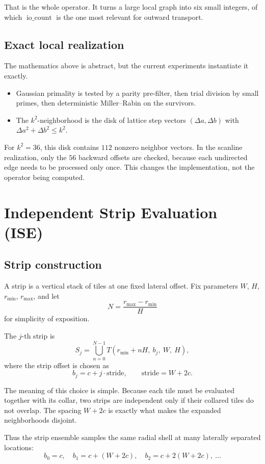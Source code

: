 \documentclass[12pt,letterpaper]{article}
\theoremstyle{definition}
\theoremstyle{remark}
\newcommand{\iocount}{\operatorname{io\_count}}
\begin{document}
That is the whole operator. It turns a large local graph into six small integers, of which $\iocount$ is the one most relevant for outward transport.

\subsection{Exact local realization}

The mathematics above is abstract, but the current experiments instantiate it exactly.

\begin{itemize}
\item Gaussian primality is tested by a parity pre-filter, then trial division by small primes, then deterministic Miller--Rabin on the survivors.
\item The $k^2$-neighborhood is the disk of lattice step vectors $(\Delta a,\Delta b)$ with $\Delta a^2+\Delta b^2\le k^2$.
\end{itemize}

For $k^2=36$, this disk contains $112$ nonzero neighbor vectors. In the scanline realization, only the $56$ backward offsets are checked, because each undirected edge needs to be processed only once. This changes the implementation, not the operator being computed.

\section{Independent Strip Evaluation (ISE)}

\subsection{Strip construction}

A strip is a vertical stack of tiles at one fixed lateral offset. Fix parameters $W$, $H$, $r_{\min}$, $r_{\max}$, and let
\[
N=\frac{r_{\max}-r_{\min}}{H}
\]
for simplicity of exposition.

The $j$-th strip is
\[
S_j
=
\bigcup_{n=0}^{N-1} T(r_{\min}+nH,\ b_j,\ W,\ H),
\]
where the strip offset is chosen as
\[
b_j=c+j\cdot \mathrm{stride},
\qquad
\mathrm{stride}=W+2c.
\]

The meaning of this choice is simple. Because each tile must be evaluated together with its collar, two strips are independent only if their collared tiles do not overlap. The spacing $W+2c$ is exactly what makes the expanded neighborhoods disjoint.

Thus the strip ensemble samples the same radial shell at many laterally separated locations:
\[
b_0=c,\quad b_1=c+(W+2c),\quad b_2=c+2(W+2c),\ \dots
\]
\end{document}
